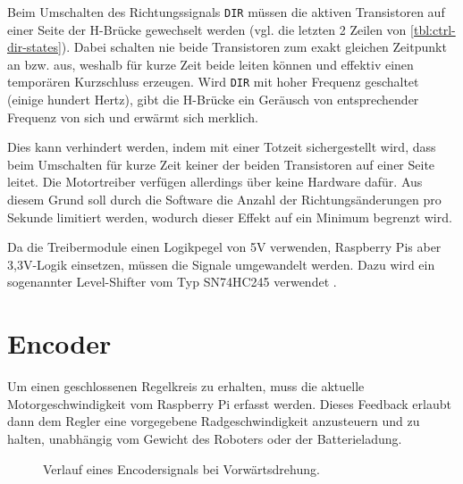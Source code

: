 \documentclass[german]{thesis_KBS}
\newcommand{\code}[1]{\texttt{#1}}  %
\begin{document}
Beim Umschalten des Richtungssignals \code{DIR} müssen die aktiven Transistoren
auf einer Seite der H-Brücke gewechselt werden (vgl. die letzten 2 Zeilen von
\autoref{tbl:ctrl-dir-states}). Dabei schalten nie beide Transistoren zum exakt
gleichen Zeitpunkt an bzw. aus, weshalb für kurze Zeit beide leiten können und
effektiv einen temporären Kurzschluss erzeugen. Wird \code{DIR} mit hoher
Frequenz geschaltet (einige hundert Hertz), gibt die H-Brücke ein Geräusch von
entsprechender Frequenz von sich und erwärmt sich merklich.

Dies kann verhindert werden, indem mit einer Totzeit sichergestellt wird, dass
beim Umschalten für kurze Zeit keiner der beiden Transistoren auf einer Seite
leitet. Die Motortreiber verfügen allerdings über keine Hardware dafür. Aus
diesem Grund soll durch die Software die Anzahl der Richtungsänderungen pro
Sekunde limitiert werden, wodurch dieser Effekt auf ein Minimum begrenzt wird.

Da die Treibermodule einen Logikpegel von 5V verwenden, Raspberry Pis aber
3,3V-Logik einsetzen, müssen die Signale umgewandelt werden. Dazu wird ein
sogenannter Level-Shifter vom Typ SN74HC245 verwendet
\cite{levelshifter-datasheet}.


\section{Encoder}

Um einen geschlossenen Regelkreis zu erhalten, muss die aktuelle
Motorgeschwindigkeit vom Raspberry Pi erfasst werden. Dieses Feedback erlaubt
dann dem Regler eine vorgegebene Radgeschwindigkeit anzusteuern und zu halten,
unabhängig vom Gewicht des Roboters oder der Batterieladung.

\begin{figure}[h]
    \centering
    \caption{
        Verlauf eines Encodersignals bei Vorwärtsdrehung.
    }
    \label{fig:encoder-signal}
\end{figure}
\end{document}
